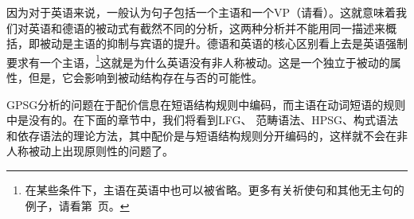 因为对于英语来说，一般认为句子包括一个主语和一个VP（请看\citealp[]{GKPS85a}）。这就意味着我们对英语和德语的被动式有截然不同的分析，这两种分析并不能用同一描述来概括，即被动是主语的抑制与宾语的提升。德语和英语的核心区别看上去是英语强制要求有一个主语，\footnote{%
  在某些条件下，主语在英语中也可以被省略。更多有关祈使句和其他无主句的例子，请看第~\pageref{Beispiel-Imperativ-Englisch}页。
}这就是为什么英语没有非人称被动。这是一个独立于被动的属性，但是，它会影响到被动结构存在与否的可能性。

GPSG分析的问题在于配价信息在短语结构规则中编码，而主语在动词短语的规则中是没有的。在下面的章节中，我们将看到LFG\indexlfgc、
范畴语法\indexcgc、HPSG\indexhpsgc、构式语法\indexcxgc 和依存语法\indexdgc 的理论方法，其中配价是与短语结构规则分开编码的，这样就不会在非人称被动上出现原则性的问题了。

